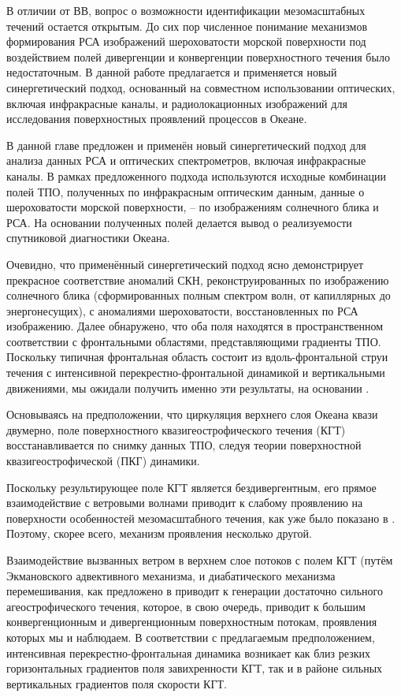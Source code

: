 В отличии от ВВ, вопрос о возможности идентификации мезомасштабных течений остается открытым. До сих пор численное понимание механизмов формирования РСА изображений шероховатости морской поверхности под воздействием полей дивергенции и конвергенции поверхностного течения было недостаточным.  В данной работе предлагается и применяется новый синергетический подход, основанный на совместном использовании оптических, включая инфракрасные каналы, и радиолокационных изображений для исследования поверхностных проявлений процессов в Океане.

В данной главе предложен и применён новый синергетический подход для анализа данных РСА и оптических спектрометров, включая инфракрасные каналы. В рамках предложенного подхода используются исходные комбинации полей ТПО, полученных по инфракрасным оптическим данным, данные о шероховатости морской поверхности, -- по изображениям солнечного блика и РСА. На основании полученных полей делается вывод о реализуемости спутниковой диагностики Океана.

Очевидно, что применённый синергетический подход ясно демонстрирует прекрасное соответствие аномалий СКН, реконструированных по изображению солнечного блика (сформированных полным спектром волн, от капиллярных до энергонесущих), с аномалиями шероховатости, восстановленных по РСА изображению. Далее обнаружено, что оба поля находятся в пространственном соответствии с фронтальными областями, представляющими градиенты ТПО. Поскольку типичная фронтальная область состоит из вдоль-фронтальной струи течения с интенсивной перекрестно-фронтальной динамикой и вертикальными движениями, мы ожидали получить именно эти результаты, на основании \citep{Kudryavtsev2005,Johannessen2005}.

Основываясь на предположении, что циркуляция верхнего слоя Океана квази двумерно, поле поверхностного квазигеострофического течения (КГТ) восстанавливается по снимку данных ТПО, следуя теории поверхностной квазигеострофической (ПКГ) динамики. 

Поскольку результирующее поле КГТ является бездивергентным, его прямое взаимодействие с ветровыми волнами приводит к слабому проявлению на поверхности особенностей мезомасштабного течения, как уже было показано в \citep{Kudryavtsev2005,Johannessen2005}. Поэтому, скорее всего, механизм проявления несколько другой. 

Взаимодействие вызванных ветром в верхнем слое потоков с полем КГТ (путём Экмановского адвективного механизма, и диабатического механизма перемешивания, как предложено в \citep{Klein1990,Garrett1981}  приводит к генерации достаточно сильного агеострофического течения, которое, в свою очередь, приводит к большим конвергенционным и дивергенционным поверхностным потокам, проявления которых мы и наблюдаем. В соответствии с предлагаемым предположением, интенсивная перекрестно-фронтальная динамика возникает как близ резких горизонтальных градиентов поля завихренности КГТ, так и в районе сильных вертикальных градиентов поля скорости КГТ.

